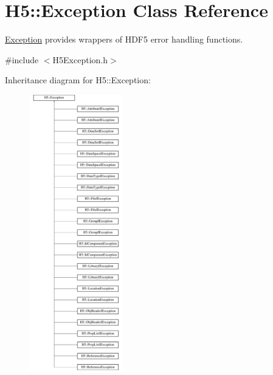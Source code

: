 \hypertarget{class_h5_1_1_exception}{}\section{H5\+:\+:Exception Class Reference}
\label{class_h5_1_1_exception}


\hyperlink{class_h5_1_1_exception}{Exception} provides wrappers of H\+D\+F5 error handling functions.  




{\ttfamily \#include $<$H5\+Exception.\+h$>$}

Inheritance diagram for H5\+:\+:Exception\+:\begin{figure}[H]
\begin{center}
\leavevmode
\includegraphics[height=12.000000cm]{class_h5_1_1_exception}
\end{center}
\end{figure}
